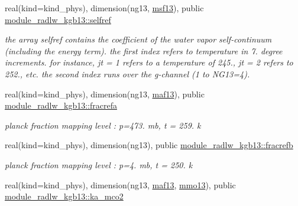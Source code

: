 \begin{DoxyCompactItemize}
real(kind=kind\+\_\+phys), dimension(ng13, \hyperlink{group__module__radlw__kgbnn_ga7f88590d2a9fc392b04e89fd3d4bf2bf}{msf13}), public \hyperlink{group__module__radlw__kgbnn_gac8f58bba6aa4b72ffd01f78e60d0831f}{module\+\_\+radlw\+\_\+kgb13\+::selfref}
\begin{DoxyCompactList}\small\item\em the array selfref contains the coefficient of the water vapor self-\/continuum (including the energy term). the first index refers to temperature in 7. degree increments. for instance, jt = 1 refers to a temperature of 245., jt = 2 refers to 252., etc. the second index runs over the g-\/channel (1 to N\+G13=4). \end{DoxyCompactList}\item 
\mbox{\label{group__module__radlw__kgbnn_ga82aed8a05cd528b287e336f7ff8fcebb}} 
real(kind=kind\+\_\+phys), dimension(ng13, \hyperlink{group__module__radlw__kgbnn_ga1ddc025df872b12194b8c6344cc0204e}{maf13}), public \hyperlink{group__module__radlw__kgbnn_ga82aed8a05cd528b287e336f7ff8fcebb}{module\+\_\+radlw\+\_\+kgb13\+::fracrefa}
\begin{DoxyCompactList}\small\item\em planck fraction mapping level \+: p=473. mb, t = 259. k \end{DoxyCompactList}\item 
\mbox{\label{group__module__radlw__kgbnn_ga92d45aee9dab62549ea8821eae7422dd}} 
real(kind=kind\+\_\+phys), dimension(ng13), public \hyperlink{group__module__radlw__kgbnn_ga92d45aee9dab62549ea8821eae7422dd}{module\+\_\+radlw\+\_\+kgb13\+::fracrefb}
\begin{DoxyCompactList}\small\item\em planck fraction mapping level \+: p=4. mb, t = 250. k \end{DoxyCompactList}\item 
\mbox{\label{group__module__radlw__kgbnn_ga523a0bc861ea861869f59b7bd007ff50}} 
real(kind=kind\+\_\+phys), dimension(ng13, \hyperlink{group__module__radlw__kgbnn_ga1ddc025df872b12194b8c6344cc0204e}{maf13}, \hyperlink{group__module__radlw__kgbnn_gae513ce55829a57a0dbda77f570e4a619}{mmo13}), public \hyperlink{group__module__radlw__kgbnn_ga523a0bc861ea861869f59b7bd007ff50}{module\+\_\+radlw\+\_\+kgb13\+::ka\+\_\+mco2}

\end{DoxyCompactItemize}
